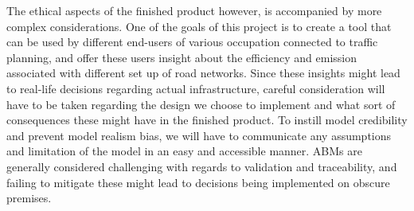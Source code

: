     The ethical aspects of the finished product however, is accompanied by more complex considerations. One of the goals of this project is to create a tool that can be used by different end-users of various occupation connected to traffic planning, and offer these users insight about the efficiency and emission associated with different set up of road networks. Since these insights might lead to real-life decisions regarding actual infrastructure, careful consideration will have to be taken regarding the design we choose to implement and what sort of consequences these might have in the finished product. To instill model credibility and prevent model realism bias, we will have to communicate any assumptions and limitation of the model in an easy and accessible manner. ABMs are generally considered challenging with regards to validation and traceability\cite{abm-validation-issues}, and failing to mitigate these might lead to decisions being implemented on obscure premises. 

